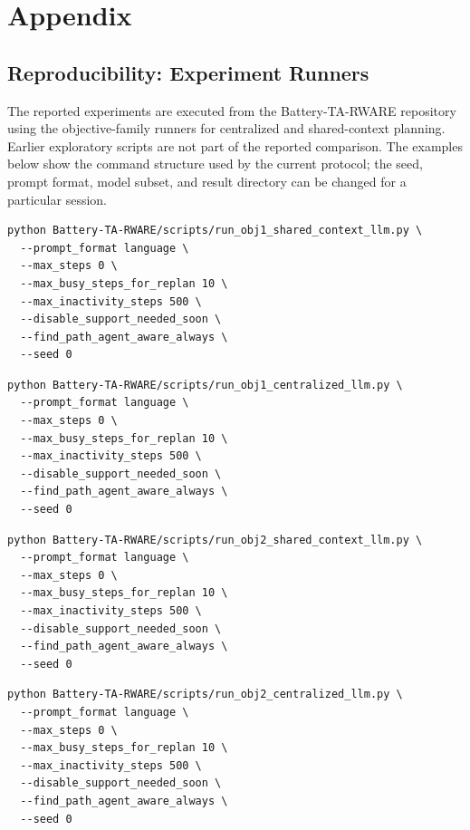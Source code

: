 \section{Appendix}
\label{app:appendix}

\subsection{Reproducibility: Experiment Runners}
\label{app:repro}
The reported experiments are executed from the Battery-TA-RWARE repository using the objective-family runners for centralized and shared-context planning.
Earlier exploratory scripts are not part of the reported comparison.
The examples below show the command structure used by the current protocol; the seed, prompt format, model subset, and result directory can be changed for a particular session.

\begin{lstlisting}[caption=Run Objective 1 with the shared-context planner., label=listing:run_obj1_shared]
python Battery-TA-RWARE/scripts/run_obj1_shared_context_llm.py \
  --prompt_format language \
  --max_steps 0 \
  --max_busy_steps_for_replan 10 \
  --max_inactivity_steps 500 \
  --disable_support_needed_soon \
  --find_path_agent_aware_always \
  --seed 0
\end{lstlisting}

\begin{lstlisting}[caption=Run Objective 1 with the centralized planner., label=listing:run_obj1_centralized]
python Battery-TA-RWARE/scripts/run_obj1_centralized_llm.py \
  --prompt_format language \
  --max_steps 0 \
  --max_busy_steps_for_replan 10 \
  --max_inactivity_steps 500 \
  --disable_support_needed_soon \
  --find_path_agent_aware_always \
  --seed 0
\end{lstlisting}

\begin{lstlisting}[caption=Run Objective 2 with the shared-context planner., label=listing:run_obj2_shared]
python Battery-TA-RWARE/scripts/run_obj2_shared_context_llm.py \
  --prompt_format language \
  --max_steps 0 \
  --max_busy_steps_for_replan 10 \
  --max_inactivity_steps 500 \
  --disable_support_needed_soon \
  --find_path_agent_aware_always \
  --seed 0
\end{lstlisting}

\begin{lstlisting}[caption=Run Objective 2 with the centralized planner., label=listing:run_obj2_centralized]
python Battery-TA-RWARE/scripts/run_obj2_centralized_llm.py \
  --prompt_format language \
  --max_steps 0 \
  --max_busy_steps_for_replan 10 \
  --max_inactivity_steps 500 \
  --disable_support_needed_soon \
  --find_path_agent_aware_always \
  --seed 0
\end{lstlisting}

